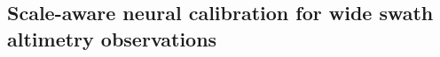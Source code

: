 \begin{bibunit}

\clearemptydoublepage
  \chapter{Scale-aware neural calibration for wide swath altimetry observations}

  






\end{bibunit}
